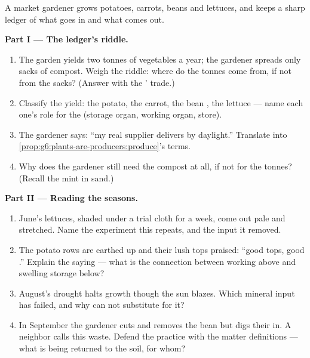 \begin{problem}\label{pb:g6:plants-are-producers:1}
A market gardener grows potatoes, carrots, beans and
lettuces, and keeps a sharp ledger of what goes in and what
comes out.

\medskip\noindent\textbf{Part I --- The ledger's riddle.}
\begin{enumerate}
  \item The garden yields two tonnes of vegetables a year;
        the gardener spreads only sacks of compost. Weigh
        the riddle: where do the tonnes come from, if not
        from the sacks? (Answer with the ' trade.)
  \item Classify the yield: the potato, the carrot, the
        bean , the lettuce  --- name each one's
        role for the  (storage organ, working organ,
         store).
  \item The gardener says: ``my real supplier delivers by
        daylight.'' Translate into
        \cref{prop:g6:plants-are-producers:produce}'s
        terms.
  \item Why does the gardener still need the compost at
        all, if not for the tonnes? (Recall the mint in
        sand.)
\end{enumerate}

\medskip\noindent\textbf{Part II --- Reading the seasons.}
\begin{enumerate}[resume]
  \item June's lettuces, shaded under a trial cloth for a
        week, come out pale and stretched. Name the
        experiment this repeats, and the input it removed.
  \item The potato rows are earthed up and their lush tops
        praised: ``good tops, good .'' Explain the
        saying --- what is the connection between working
         above and swelling storage below?
  \item August's drought halts growth though the sun
        blazes. Which mineral input has failed, and why can
         not substitute for it?
  \item In September the gardener cuts and removes the
        bean  but digs their  in. A neighbor
        calls this waste. Defend the practice with the
        matter definitions --- what is being returned to
        the soil, for whom?
\end{enumerate}


\end{problem}
